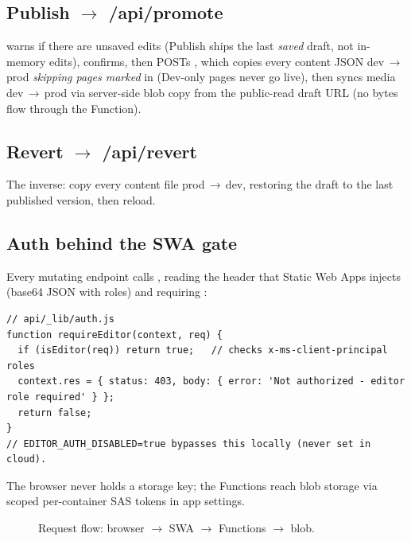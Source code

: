 \documentclass[11pt]{article}
\begin{document}
\subsection{Publish $\to$ /api/promote}

 warns if there are unsaved edits (Publish ships the last
\emph{saved} draft, not in-memory edits), confirms, then POSTs ,
which copies every content JSON dev\,$\to$\,prod \emph{skipping pages marked}
 in  (Dev-only pages never go live), then
syncs media dev\,$\to$\,prod via server-side blob copy from the public-read draft
URL (no bytes flow through the Function).

\subsection{Revert $\to$ /api/revert}

The inverse: copy every content file prod\,$\to$\,dev, restoring the draft to the
last published version, then reload.

\subsection{Auth behind the SWA gate}

Every mutating endpoint calls , reading the
 header that Static Web Apps injects (base64 JSON with
roles) and requiring :

\begin{lstlisting}
// api/_lib/auth.js
function requireEditor(context, req) {
  if (isEditor(req)) return true;   // checks x-ms-client-principal roles
  context.res = { status: 403, body: { error: 'Not authorized - editor role required' } };
  return false;
}
// EDITOR_AUTH_DISABLED=true bypasses this locally (never set in cloud).
\end{lstlisting}

The browser never holds a storage key; the Functions reach blob storage via scoped
per-container SAS tokens in app settings.

\begin{figure}[h]
\centering
{}
\caption{Request flow: browser $\to$ SWA $\to$ Functions $\to$ blob.}
\end{figure}
\end{document}
